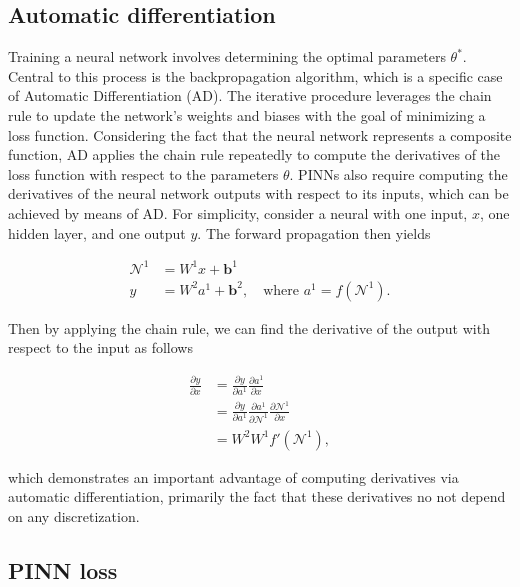 \subsection{Automatic differentiation}
Training a neural network involves determining the optimal parameters $\theta^*$. Central to this process is the backpropagation algorithm\cite{backprop}, which is a specific case of Automatic Differentiation (AD). The iterative procedure leverages the chain rule to update the network's weights and biases with the goal of minimizing a loss function. Considering the fact that the neural network represents a composite function, AD applies the chain rule repeatedly to compute the derivatives of the loss function with respect to the parameters $\theta$.
PINNs also  require computing the derivatives of the neural network outputs with respect to its inputs, which can be achieved by means of AD.
For simplicity, consider a neural with one input, $x$, one
hidden layer, and one output $y$. The forward propagation
then yields

\begin{equation*}
    \begin{aligned}
    \mathcal{N}^1&=W^1x + \mathbf{b}^1\\
    y&=W^2a^1 + \mathbf{b}^2,\quad \text{where } a^1=f(\mathcal{N}^1).
    \end{aligned}
\end{equation*}

Then by applying the chain rule, we can find the derivative of the output with respect to the input as follows

\begin{equation*}
\begin{aligned}
    \frac{\partial y}{\partial x}&=\frac{\partial y}{\partial a^1}\frac{\partial a^1}{\partial x}\\
    &=\frac{\partial y}{\partial a^1}\frac{\partial a^1}{\partial \mathcal{N}^1}\frac{\partial \mathcal{N}^1}{\partial x}\\
    &=W^2W^1f'(\mathcal{N}^1),
\end{aligned}
\end{equation*}

which demonstrates an important advantage of computing derivatives via automatic differentiation, primarily the fact that these derivatives no not depend on any discretization.
\subsection{PINN loss}

